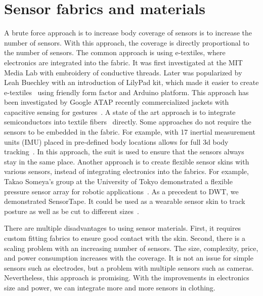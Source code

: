 \section{Sensor fabrics and materials}
A brute force approach is to increase body coverage of sensors is to increase the number of sensors. With this approach, the coverage is directly proportional to the number of sensors. The common approach is using e-textiles,  where electronics are integrated into the fabric. It was first investigated at the MIT Media Lab \cite{post2000broidery} with embroidery of conductive threads. Later was popularized by Leah Buechley with an introduction of LilyPad kit, which made it easier to create e-textiles~\cite{buechley2008lilypad} using friendly form factor and Arduino platform.  This approach has been investigated by Google ATAP recently commercialized jackets with capacitive sensing for gestures~\cite{poupyrev2016project}. A state of the art approach is to integrate semiconductors into textile fibers~\cite{orf2011fiber} directly. Some approaches do not require the sensors to be embedded in the fabric. For example, with 17 inertial measurement units (IMU) placed in pre-defined body locations allows for full 3d body tracking~\cite{roetenberg2009xsens}. In this approach, the suit is used to ensure that the sensors always stay in the same place. 
Another approach is to create flexible sensor skins with various sensors, instead of integrating electronics into the fabrics. For example, Takao Someya's group at the University of Tokyo demonstrated a flexible pressure sensor array for robotic applications~\cite{someya2004large}.
As a precedent to DWT, we demonstrated  SensorTape. It could be used as a wearable sensor skin to track posture as well as be cut to different sizes~\cite{dementyev2015sensortape}. 

There are multiple disadvantages to using sensor materials. First, it requires custom fitting fabrics to ensure good contact with the skin. Second, there is a scaling problem with an increasing number of sensors. The size, complexity, price, and power consumption increases with the coverage. It is not an issue for simple sensors such as electrodes, but a problem with multiple sensors such as cameras. Nevertheless, this approach is promising. With the improvements in electronics size and power, we can integrate more and more sensors in clothing. 

